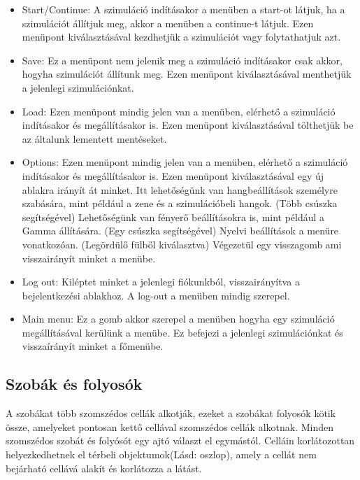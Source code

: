 \begin{itemize}
\item Start/Continue:
A szimuláció indításakor a menüben a start-ot látjuk, ha a szimulációt állítjuk meg, akkor a menüben a continue-t látjuk.
Ezen menüpont kiválasztásával kezdhetjük a szimulációt vagy folytathatjuk azt.

\item Save:
Ez a menüpont nem jelenik meg a szimuláció indításakor csak akkor, hogyha szimulációt állítunk meg.
Ezen menüpont kiválasztásával menthetjük a jelenlegi szimulációnkat.

\item Load:
Ezen menüpont mindig jelen van a menüben, elérhető a szimuláció indításakor és megállításakor is.
Ezen menüpont kiválasztásával tölthetjük be az általunk lementett mentéseket.

\item Options:
Ezen menüpont mindig jelen van a menüben, elérhető a szimuláció indításakor és megállításakor is.
Ezen menüpont kiválasztásával egy új ablakra irányít át minket.
Itt lehetőségünk van hangbeállítások személyre szabására, mint például a zene és a szimulációbeli hangok. (Több csúszka segítségével)
Lehetőségünk van fényerő beállításokra is, mint például a Gamma állítására. (Egy csúszka segítségével)
Nyelvi beállítások a menüre vonatkozóan. (Legördülő fülből kiválasztva)
Végezetül egy visszagomb ami visszairányít minket a menübe.

\item Log out:
Kiléptet minket a jelenlegi fiókunkból, visszairányítva a bejelentkezési ablakhoz.
A log-out a menüben mindig szerepel.

\item Main menu:
Ez a gomb akkor szerepel a menüben hogyha egy szimuláció megállításával kerülünk a menübe.
Ez befejezi a jelenlegi szimulációnkat és visszaírányít minket a főmenübe.
\end{itemize}


\subsection{Szobák és folyosók}

A szobákat több szomszédos cellák alkotják, ezeket a szobákat folyosók kötik össze, amelyeket pontosan kettő cellával szomszédos cellák alkotnak.
Minden szomszédos szobát és folyósót egy ajtó választ el egymástól.
Celláin korlátozottan helyezkedhetnek el térbeli objektumok(Lásd: oszlop), amely a cellát nem bejárható cellává alakít és korlátozza a látást.

